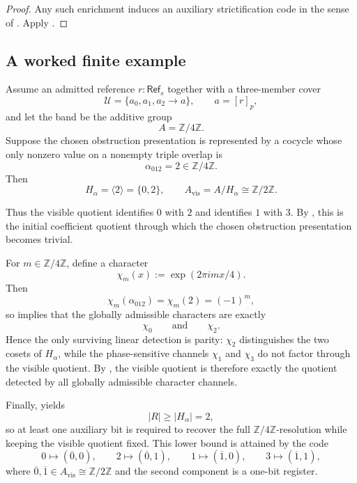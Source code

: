 \begin{proof}
Any such enrichment induces an auxiliary strictification code in the sense of . Apply .
\end{proof}

\subsection{A worked finite example}

\begin{example}\label{ex:one-bit-hidden-obstruction}
Assume an admitted reference $r:\mathsf{Ref}_s$ together with a three-member cover
\[
\mathcal U=\{a_0,a_1,a_2\to a\},
\qquad
a=[r]_p,
\]
and let the band be the additive group
\[
A=\mathbb Z/4\mathbb Z.
\]
Suppose the chosen obstruction presentation is represented by a cocycle whose only nonzero value on a nonempty triple overlap is
\[
\alpha_{012}=2\in \mathbb Z/4\mathbb Z.
\]
Then
\[
H_\alpha=\langle 2\rangle=\{0,2\},
\qquad
A_{\mathrm{vis}}=A/H_\alpha\cong \mathbb Z/2\mathbb Z.
\]

Thus the visible quotient identifies $0$ with $2$ and identifies $1$ with $3$. By , this is the initial coefficient quotient through which the chosen obstruction presentation becomes trivial.

For $m\in\mathbb Z/4\mathbb Z$, define a character
\[
\chi_m(x):=\exp(2\pi i mx/4).
\]
Then
\[
\chi_m(\alpha_{012})=\chi_m(2)=(-1)^m,
\]
so  implies that the globally admissible characters are exactly
\[
\chi_0
\qquad\text{and}\qquad
\chi_2.
\]
Hence the only surviving linear detection is parity: $\chi_2$ distinguishes the two cosets of $H_\alpha$, while the phase-sensitive channels $\chi_1$ and $\chi_3$ do not factor through the visible quotient. By , the visible quotient is therefore exactly the quotient detected by all globally admissible character channels.

Finally,  yields
\[
|R|\ge |H_\alpha|=2,
\]
so at least one auxiliary bit is required to recover the full $\mathbb Z/4\mathbb Z$-resolution while keeping the visible quotient fixed. This lower bound is attained by the code
\[
0\mapsto (\overline{0},0),\qquad
2\mapsto (\overline{0},1),\qquad
1\mapsto (\overline{1},0),\qquad
3\mapsto (\overline{1},1),
\]
where $\overline{0},\overline{1}\in A_{\mathrm{vis}}\cong \mathbb Z/2\mathbb Z$ and the second component is a one-bit register.
\end{example}
